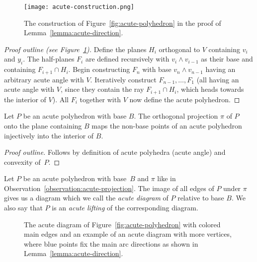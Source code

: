 \begin{figure}[ht]
  \centering
  \texttt{[image: acute-construction.png]}
  \caption{The construction of Figure~\ref{fig:acute-polyhedron} in the proof of Lemma~\ref{lemma:acute-direction}.}
  \label{fig:acute-construction}
\end{figure}

\begin{proof}[Proof outline (see Figure~\ref{fig:acute-construction})]
  Define the planes $H_i$ orthogonal to $V$ containing $v_i$ and $y_i$. The half-planes $F_i$ are defined recursively with $v_i \wedge v_{i-1}$ as their base and containing $F_{i+1} \cap H_i$.
  Begin constructing $F_n$ with base $v_n \wedge v_{n-1}$ having an arbitrary acute angle with $V$. Iteratively construct $F_{n-1},\dots,F_1$ (all having an acute angle with $V$, since they contain the ray $F_{i+1} \cap H_i$, which heads towards the interior of $V$). All $F_i$ together with $V$ now define the acute polyhedron.
\end{proof}

\begin{observation}\label{observation:acute-projection}
  Let $P$ be an acute polyhedron with base $B$.
  The orthogonal projection $\pi$ of $P$ onto the plane containing $B$ maps the non-base points of an acute polyhedron injectively into the interior of $B$.
\end{observation}

\begin{proof}[Proof outline]
  Follows by definition of acute polyhedra (acute angle) and convexity of~$P$.
\end{proof}

\begin{definition}
  Let $P$ be an acute polyhedron with base~$B$ and $\pi$ like in Observation~\ref{observation:acute-projection}.
  The image of all edges of $P$ under $\pi$ gives us a diagram which we call the \emph{acute diagram} of $P$ relative to base $B$.
  We also say that $P$ is an \emph{acute lifting} of the corresponding diagram.
\end{definition}

\begin{figure}[ht]
  \centering
  \hspace*{10mm}
  \caption{The acute diagram of Figure~\ref{fig:acute-polyhedron} with colored main edges and an example of an acute diagram with more vertices, where blue points fix the main arc directions as shown in Lemma~\ref{lemma:acute-direction}.}
  \label{fig:acute-diagram}
\end{figure}

